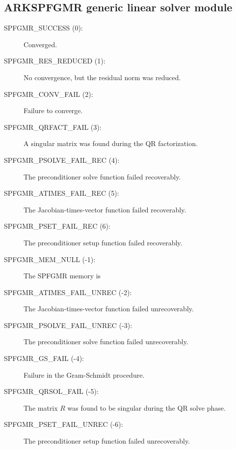 \documentclass[letterpaper,10pt,english]{sphinxmanual}
\begin{document}
\subsection{ARKSPFGMR generic linear solver module}
\label{Constants:arkspfgmr-generic-linear-solver-module}\begin{description}
\item[{SPFGMR\_SUCCESS  (0):}] \leavevmode
Converged.

\item[{SPFGMR\_RES\_REDUCED  (1):}] \leavevmode
No convergence, but the residual norm was
reduced.

\item[{SPFGMR\_CONV\_FAIL  (2):}] \leavevmode
Failure to converge.

\item[{SPFGMR\_QRFACT\_FAIL  (3):}] \leavevmode
A singular matrix was found during the
QR factorization.

\item[{SPFGMR\_PSOLVE\_FAIL\_REC  (4):}] \leavevmode
The preconditioner solve function
failed recoverably.

\item[{SPFGMR\_ATIMES\_FAIL\_REC  (5):}] \leavevmode
The Jacobian-times-vector function
failed recoverably.

\item[{SPFGMR\_PSET\_FAIL\_REC  (6):}] \leavevmode
The preconditioner setup function failed
recoverably.

\item[{SPFGMR\_MEM\_NULL  (-1):}] \leavevmode
The SPFGMR memory is 

\item[{SPFGMR\_ATIMES\_FAIL\_UNREC  (-2):}] \leavevmode
The Jacobian-times-vector function
failed unrecoverably.

\item[{SPFGMR\_PSOLVE\_FAIL\_UNREC  (-3):}] \leavevmode
The preconditioner solve function
failed unrecoverably.

\item[{SPFGMR\_GS\_FAIL  (-4):}] \leavevmode
Failure in the Gram-Schmidt procedure.

\item[{SPFGMR\_QRSOL\_FAIL  (-5):}] \leavevmode
The matrix $R$ was found to be
singular during the QR solve phase.

\item[{SPFGMR\_PSET\_FAIL\_UNREC  (-6):}] \leavevmode
The preconditioner setup function
failed unrecoverably.

\end{description}
\end{document}
